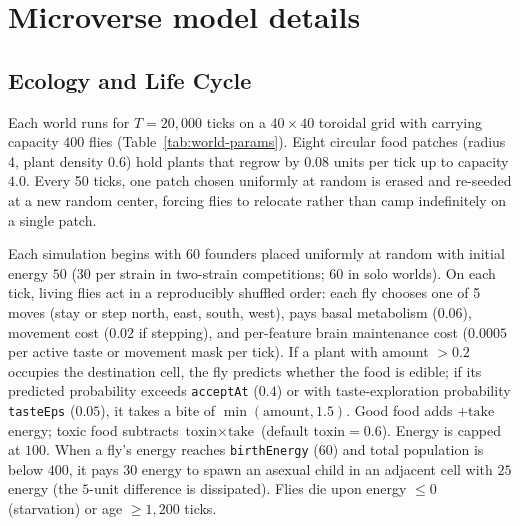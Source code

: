 \section{Microverse model details}
\label{app:model}
\subsection{Ecology and Life Cycle}

Each world runs for $T = 20{,}000$ ticks on a $40\times 40$ toroidal grid with carrying capacity $400$ flies (Table~\ref{tab:world-params}). Eight circular food patches (radius 4, plant density 0.6) hold plants that regrow by $0.08$ units per tick up to capacity $4.0$. Every 50 ticks, one patch chosen uniformly at random is erased and re-seeded at a new random center, forcing flies to relocate rather than camp indefinitely on a single patch.

Each simulation begins with 60 founders placed uniformly at random with initial energy $50$ (30 per strain in two-strain competitions; 60 in solo worlds). On each tick, living flies act in a reproducibly shuffled order: each fly chooses one of 5 moves (stay or step north, east, south, west), pays basal metabolism ($0.06$), movement cost ($0.02$ if stepping), and per-feature brain maintenance cost ($0.0005$ per active taste or movement mask per tick). If a plant with amount $> 0.2$ occupies the destination cell, the fly predicts whether the food is edible; if its predicted probability exceeds \texttt{acceptAt} ($0.4$) or with taste-exploration probability \texttt{tasteEps} ($0.05$), it takes a bite of $\min(\text{amount}, 1.5)$. Good food adds $+\text{take}$ energy; toxic food subtracts $\text{toxin}\times\text{take}$ (default $\text{toxin}=0.6$). Energy is capped at $100$. When a fly's energy reaches \texttt{birthEnergy} ($60$) and total population is below $400$, it pays $30$ energy to spawn an asexual child in an adjacent cell with $25$ energy (the $5$-unit difference is dissipated). Flies die upon energy $\le 0$ (starvation) or age $\ge 1{,}200$ ticks.

